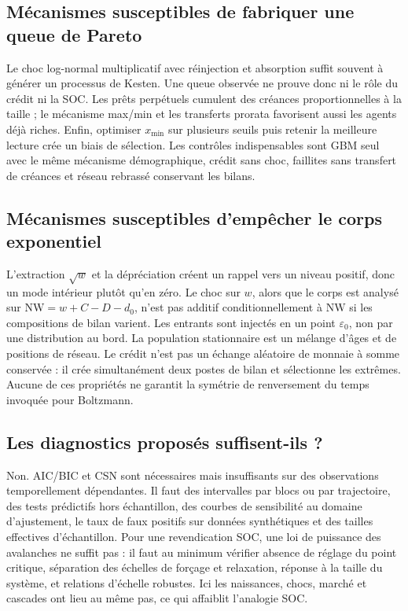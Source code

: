 \documentclass[11pt,a4paper]{article}
\newcommand{\NW}{\mathrm{NW}}
\begin{document}
\subsection{Mécanismes susceptibles de fabriquer une queue de Pareto}

Le choc log-normal multiplicatif avec réinjection et absorption suffit souvent à
générer un processus de Kesten. Une queue observée ne prouve donc ni le rôle du
crédit ni la SOC. Les prêts perpétuels cumulent des créances proportionnelles à
la taille ; le mécanisme max/min et les transferts prorata favorisent aussi les
agents déjà riches. Enfin, optimiser $x_{\min}$ sur plusieurs seuils puis retenir
la meilleure lecture crée un biais de sélection. Les contrôles indispensables
sont GBM seul avec le même mécanisme démographique, crédit sans choc, faillites
sans transfert de créances et réseau rebrassé conservant les bilans.

\subsection{Mécanismes susceptibles d'empêcher le corps exponentiel}

L'extraction $\sqrt w$ et la dépréciation créent un rappel vers un niveau positif,
donc un mode intérieur plutôt qu'en zéro. Le choc sur $w$, alors que le corps est
analysé sur $\NW=w+C-D-d_0$, n'est pas additif conditionnellement à $\NW$ si les
compositions de bilan varient. Les entrants sont injectés en un point
$\varepsilon_0$, non par une distribution au bord. La population stationnaire est
un mélange d'âges et de positions de réseau. Le crédit n'est pas un échange
aléatoire de monnaie à somme conservée : il crée simultanément deux postes de
bilan et sélectionne les extrêmes. Aucune de ces propriétés ne garantit la
symétrie de renversement du temps invoquée pour Boltzmann.

\subsection{Les diagnostics proposés suffisent-ils ?}

Non. AIC/BIC et CSN sont nécessaires mais insuffisants sur des observations
temporellement dépendantes. Il faut des intervalles par blocs ou par trajectoire,
des tests prédictifs hors échantillon, des courbes de sensibilité au domaine
d'ajustement, le taux de faux positifs sur données synthétiques et des tailles
effectives d'échantillon. Pour une revendication SOC, une loi de puissance des
avalanches ne suffit pas : il faut au minimum vérifier absence de réglage du
point critique, séparation des échelles de forçage et relaxation, réponse à la
taille du système, et relations d'échelle robustes. Ici les naissances, chocs,
marché et cascades ont lieu au même pas, ce qui affaiblit l'analogie SOC.
\end{document}
